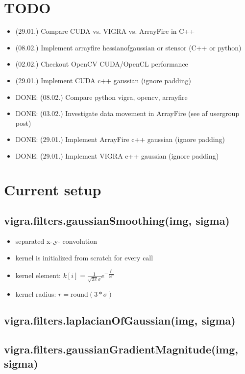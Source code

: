 \documentclass[12pt,a4paper]{article}
\begin{document}
\setlength{\parindent}{0pt}


\section{TODO}
  \begin{itemize}
    \item (29.01.) Compare CUDA vs. VIGRA vs. ArrayFire in C++
    \item (08.02.) Implement arrayfire hessianofgaussian or stensor (C++ or python)
    \item (02.02.) Checkout OpenCV CUDA/OpenCL performance
    \item (29.01.) Implement CUDA c++ gaussian (ignore padding)
    \item DONE: (08.02.) Compare python vigra, opencv, arrayfire
    \item DONE: (03.02.) Investigate data movement in ArrayFire (see af usergroup post)
    \item DONE: (29.01.) Implement ArrayFire c++ gaussian (ignore padding)
    \item DONE: (29.01.) Implement VIGRA c++ gaussian (ignore padding)
  \end{itemize}


\section{Current setup}
  \subsection{vigra.filters.gaussianSmoothing(img, sigma)}
    \begin{itemize}
      \item separated x-,y- convolution
      \item kernel is initialized from scratch for every call
      \item kernel element: $k[i] = \frac{1}{\sqrt{2\pi}\sigma} e^{-\frac{i^2}{2\sigma^2}} $
      \item kernel radius: $r = \textrm{round}(3*\sigma)$
    \end{itemize}
  \subsection{vigra.filters.laplacianOfGaussian(img, sigma)}
  \subsection{vigra.filters.gaussianGradientMagnitude(img, sigma)}
\end{document}
